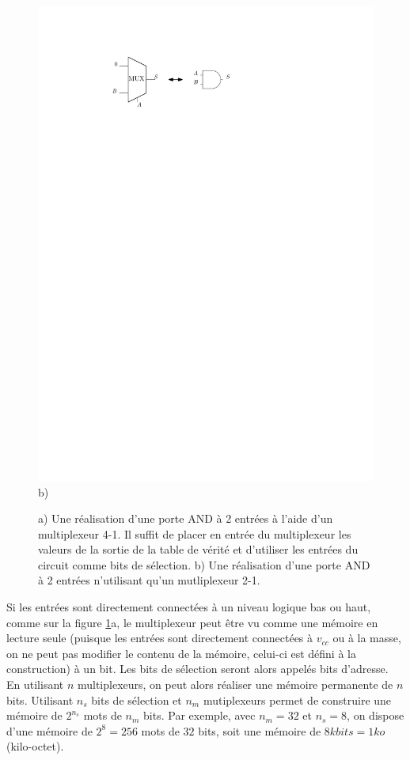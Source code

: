 \begin{figure}[htbp]
\begin{minipage}[c]{0.4\linewidth}
\includegraphics[width=\linewidth]{Figs/and_mux2.pdf}\\\centering b)
   \end{minipage}
\caption{\label{fig:and_mux} a) Une réalisation d'une porte AND à 2 entrées à l'aide d'un multiplexeur 4-1. Il suffit de placer en entrée du multiplexeur les valeurs de la sortie de la table de vérité et d'utiliser les entrées du circuit comme bits de sélection. b) Une réalisation d'une porte AND à 2 entrées n'utilisant qu'un mutliplexeur 2-1.}
\end{figure}

Si les entrées sont directement connectées à un niveau logique bas ou haut, comme sur la figure \ref{fig:and_mux}a, le multiplexeur peut être vu comme une mémoire en lecture seule (puisque les entrées sont directement connectées à $v_{cc}$ ou à la masse, on ne peut pas modifier le contenu de la mémoire, celui-ci est défini à la construction) à un bit. Les bits de sélection seront alors appelés bits d'adresse. En utilisant $n$ multiplexeurs, on peut alors réaliser une mémoire permanente de $n$ bits. Utilisant $n_s$ bits de sélection et $n_m$ mutiplexeurs permet de construire une mémoire de $2^{n_s}$ mots de $n_m$ bits. Par exemple, avec $n_m = 32$ et $n_s = 8$, on dispose d'une mémoire de $2^8 = 256$ mots de $32$ bits, soit une mémoire de $8 kbits = 1 ko$ (kilo-octet).


